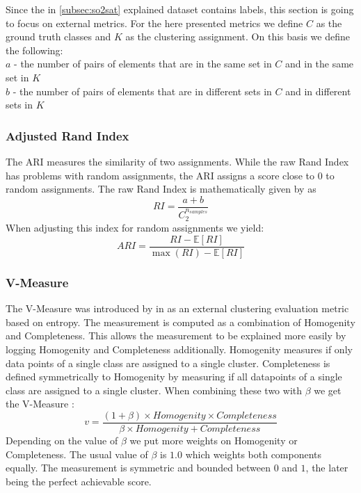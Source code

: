 Since the in \cref{subsec:so2sat} explained dataset contains labels, this section is going to focus on external metrics.
For the here presented metrics we define \(C\) as the ground truth classes and \(K\) as the clustering assignment.
On this basis we define the following:\\
\(a\) - the number of pairs of elements that are in the same set in \(C\) and in the same set in \(K\)\\
\(b\) - the number of pairs of elements that are in different sets in \(C\) and in different sets in \(K\)\\


\subsubsection{Adjusted Rand Index}
The \gls{ARI} measures the similarity of two assignments. While the raw Rand Index has problems with random assignments, the \gls{ARI} assigns a score close to \(0\)
to random assignments.
The raw Rand Index is mathematically given by \cite{noauthor_23_2020} as
\[RI = \frac{a + b}{C_2^{n_{samples}}}\]
When adjusting this index for random assignments we yield:
\[ARI = \frac{RI - \mathbb{E} [RI]}{\max (RI) - \mathbb{E} [RI]}\]


\subsubsection{V-Measure}
\label{ssec:v_measure}
The V-Measure was introduced by \citeauthor{rosenberg_v-measure_2007} in \cite{rosenberg_v-measure_2007} as an external clustering evaluation metric based on entropy.
The measurement is computed as a combination of Homogenity and Completeness. This allows the measurement to be explained more easily by logging Homogenity and Completeness additionally.
Homogenity measures if only data points of a single class are assigned to a single cluster. Completeness is defined symmetrically to Homogenity by measuring if all datapoints of a single class are assigned to
a single cluster.
When combining these two with \(\beta\) we get the V-Measure \cite{noauthor_23_2020}:
\[v = \frac{(1 + \beta) \times \mathit{Homogenity} \times \mathit{Completeness}}{\beta \times \mathit{Homogenity} + \mathit{Completeness}}\]
Depending on the value of \(\beta\) we put more weights on Homogenity or Completeness. The usual value of \(\beta\) is \(1.0\) which weights both components equally.
The measurement is symmetric and bounded between \(0\) and \(1\), the later being the perfect achievable score.



